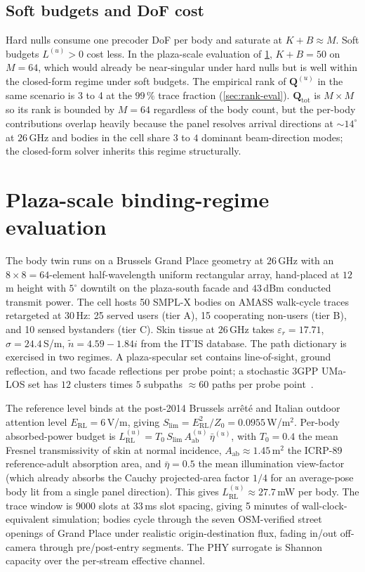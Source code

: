 \documentclass[journal,twocolumn,10pt]{IEEEtran}
\theoremstyle{plain}
\theoremstyle{remark}
\newcommand{\Aab}{A_{\mathrm{ab}}}
\newcommand{\Qmat}{\mathbf{Q}}
\newcommand{\ntilde}{\tilde{n}}
\begin{document}
\subsection{Soft budgets and DoF cost}\label{sec:softbudget}

Hard nulls consume one precoder DoF per body and saturate at
$K + B \approx M$. Soft budgets $L^{(u)} > 0$ cost less. In the
plaza-scale evaluation of \cref{sec:eval}, $K + B = 50$ on $M = 64$,
which would already be near-singular under hard nulls but is well
within the closed-form regime under soft budgets. The empirical rank
of $\Qmat^{(u)}$ in the same scenario is 3 to 4 at the $99\,\%$
trace fraction (\cref{sec:rank-eval}). $\Qmat_{\mathrm{tot}}$ is
$M\times M$ so its rank is bounded by $M = 64$ regardless of the
body count, but the per-body contributions overlap heavily because
the panel resolves arrival directions at $\sim 14^\circ$ at
$26\,$GHz and bodies in the cell share $3$ to $4$ dominant
beam-direction modes; the closed-form solver inherits this regime
structurally.


\section{Plaza-scale binding-regime evaluation}\label{sec:eval}

The body twin runs on a Brussels Grand Place geometry at $26\,$GHz
with an $8 \times 8 = 64$-element half-wavelength uniform rectangular
array, hand-placed at $12\,$m height with $5^\circ$ downtilt on the
plaza-south facade and $43\,$dBm conducted transmit power. The cell
hosts 50 SMPL-X bodies on AMASS walk-cycle traces retargeted at
$30\,$Hz: 25 served users (tier A), 15 cooperating non-users
(tier B), and 10 sensed bystanders (tier C). Skin tissue at
$26\,$GHz takes
$\varepsilon_r = 17.71$, $\sigma = 24.4\,$S/m,
$\ntilde = 4.59 - 1.84i$ from the IT'IS database. The path
dictionary is exercised in two regimes. A plaza-specular set
contains line-of-sight, ground reflection, and two facade reflections
per probe point; a stochastic 3GPP UMa-LOS set has $12$ clusters
times $5$ subpaths $\approx 60$ paths per probe
point~\cite{TR38901}.

The reference level binds at the post-2014 Brussels arr\^et\'e and
Italian outdoor attention level $E_{\mathrm{RL}} = 6\,$V/m, giving
$S_{\mathrm{lim}} = E_{\mathrm{RL}}^2 / Z_0 = 0.0955\,$W/m$^2$.
Per-body absorbed-power budget is
$L^{(u)}_{\mathrm{RL}} = T_0\,S_{\mathrm{lim}}\,\Aab^{(u)}\,
\bar\eta^{(u)}$, with $T_0 = 0.4$ the mean Fresnel transmissivity
of skin at normal incidence, $\Aab \approx 1.45\,$m$^2$ the
ICRP-89 reference-adult absorption area, and $\bar\eta = 0.5$
the mean illumination view-factor (which already absorbs the
Cauchy projected-area factor $1/4$ for an average-pose body lit
from a single panel direction). This gives
$L^{(u)}_{\mathrm{RL}} \approx 27.7\,$mW per body. The trace window is $9000$ slots at $33\,$ms slot
spacing, giving 5 minutes of wall-clock-equivalent simulation;
bodies cycle through the seven OSM-verified street openings of
Grand Place under realistic origin-destination flux, fading
in/out off-camera through pre/post-entry segments. The PHY surrogate
is Shannon capacity over the per-stream effective channel.
\end{document}
